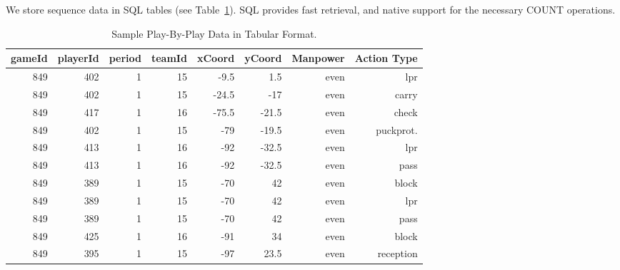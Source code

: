 
We store sequence data in SQL tables (see Table~\ref{table:play-by-play-data}). SQL provides fast retrieval,  and  native support for the necessary COUNT operations.


\begin{table}[htbp]
  \centering
  \caption{Sample Play-By-Play Data in Tabular Format. }
    \begin{tabular}{rrrrrrrr}
    \toprule
    gameId & playerId & period & teamId & xCoord & yCoord & Manpower & Action Type \\
    \midrule
    849   & 402   & 1     & 15    & -9.5  & 1.5   & even & lpr \\
    849   & 402   & 1     & 15    & -24.5 & -17   & even & carry \\
    849   & 417   & 1     & 16    & -75.5 & -21.5 & even & check \\
    849   & 402   & 1     & 15    & -79   & -19.5 & even & puckprot.\\
    849   & 413   & 1     & 16    & -92   & -32.5 & even & lpr \\
    849   & 413   & 1     & 16    & -92   & -32.5 & even & pass \\
    849   & 389   & 1     & 15    & -70   & 42    & even & block \\
    849   & 389   & 1     & 15    & -70   & 42    & even & lpr \\
    849   & 389   & 1     & 15    & -70   & 42    & even & pass \\
    849   & 425   & 1     & 16    & -91   & 34    & even & block \\
    849   & 395   & 1     & 15    & -97   & 23.5  & even & reception \\
    \bottomrule
    \end{tabular}%
  \label{table:play-by-play-data}%
\end{table}%


